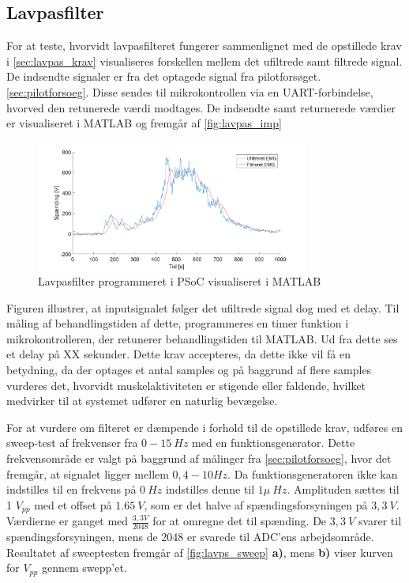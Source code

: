 \subsection{Lavpasfilter}
For at teste, hvorvidt lavpasfilteret fungerer sammenlignet med de opstillede krav i \autoref{sec:lavpas_krav} visualiseres forskellen mellem det ufiltrede samt filtrede signal. 
De indsendte signaler er fra det optagede signal fra pilotforsøget. \autoref{sec:pilotforsoeg}. Disse sendes til mikrokontrollen via en UART-forbindelse, hvorved den retunerede værdi modtages. De indsendte samt returnerede værdier er visualiseret i MATLAB og fremgår af \autoref{fig:lavpas_imp}

\begin{figure}[H]
\centering
\includegraphics[width=0.8\textwidth]{figures/EMG_test}
\caption{Lavpasfilter programmeret i PSoC visualiseret i MATLAB}
\label{fig:lavpas_imp}
\end{figure}

\noindent
Figuren illustrer, at inputsignalet følger det ufiltrede signal dog med et delay. Til måling af behandlingstiden af dette, programmeres en timer funktion i mikrokontrolleren, der retunerer behandlingstiden til MATLAB. Ud fra dette ses et delay på XX sekunder. Dette krav accepteres, da dette ikke vil få en betydning, da der optages et antal samples og på baggrund af flere samples vurderes det, hvorvidt muskelaktiviteten er stigende eller faldende, hvilket medvirker til at systemet udfører en naturlig bevægelse.


For at vurdere om filteret er dæmpende i forhold til de opstillede krav, udføres en sweep-test af frekvenser fra $0-15~Hz$ med en funktionsgenerator. Dette frekvensområde er valgt på baggrund af målinger fra \autoref{sec:pilotforsoeg}, hvor det fremgår, at signalet ligger mellem $0,4-10Hz$.  Da funktionsgeneratoren ikke kan indstilles til en frekvens på $0~Hz$ indstilles denne til $1 \mu~Hz$. Amplituden sættes til 1 $V_{pp}$ med et offset på $1.65~V$, som er det halve af spændingsforsyningen på $3,3~V$. Værdierne er ganget med $\frac{3,3V}{2048}$ for at omregne det til spænding. De $3,3~V$ svarer til spændingsforsyningen, mens de 2048 er svarede til ADC'ens arbejdsområde. Resultatet af sweeptesten fremgår af \autoref{fig:lavps_sweep} \textbf{a)}, mens \textbf{b)} viser kurven for $V_{pp}$ gennem swepp'et.

